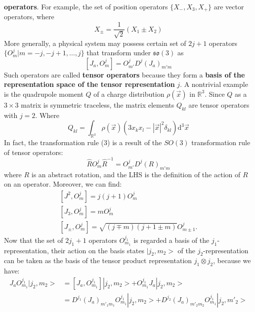 \documentclass{article}
\begin{document}
	\textbf{operators}. For example, the set of position operators $\{X_{-} ,X_{3} ,X_{+}\}$ are vector operators, where
	\begin{equation*}
		X_{\pm } =\frac{1}{\sqrt{2}}( X_{1} \pm X_{2})
	\end{equation*}
	More generally, a physical system may possess certain set of $2j+1$ operators $\{O_{m}^{j} | m=-j,-j+1,\dotsc ,j\}$ that transform under $\mathfrak{so} (3)$ as
	\begin{equation}
		\left[ J_{a} ,O_{m}^{j}\right] =O_{m'}^{j} D^{j}( J_{a})_{m' m}
	\end{equation}
	Such operators are called \textbf{tensor operators} because they form a \textbf{basis of the representation space of the tensor representation }$j$. A nontrivial example is the quadrupole moment $Q$ of a charge distribution $\rho (\vec{x} )$ in $\mathbb{R}^{3}$. Since $Q$ as a $3\times 3$ matrix is symmetric traceless, the matrix elements $Q_{kl}$ are tensor operators with $j=2$. Where
	\begin{equation*}
		Q_{kl} =\int _{\mathbb{R}^{3}} \rho (\vec{x})\left( 3x_{k} x_{l} -| \vec{x}| ^{2} \delta _{kl}\right)\mathrm{d}^{3}\vec{x}
	\end{equation*}
	In fact, the transformation rule (3) is a result of the $SO( 3)$ transformation rule of tensor operators:
	\begin{equation*}
		\hat{R} O_{m}^{j}\hat{R}^{-1} =O_{m'}^{j} D^{j} (R)_{m'm}
	\end{equation*}
	where $R$ is an abstract rotation, and the LHS is the definition of the action of $R$ on an operator. Moreover, we can find:
	\begin{equation}
		\begin{array}{ l }
			\left[ J^{2} ,O_{m}^{j}\right] =j(j+1)O_{m}^{j}\\
			\left[ J_{3} ,O_{m}^{j}\right] =mO_{m}^{j}\\
			\left[ J_{\pm } ,O_{m}^{j}\right] =\sqrt{(j\mp m)(j+1\pm m)} O_{m\pm 1}^{j} .
		\end{array}
	\end{equation}
	Now that the set of $2j_{1} +1$ operators $O_{m_{1}}^{j_{1}}$ is regarded a basis of the $j_{1}$-representation, their action on the basis states $| j_{2} ,m_{2}> $ of the $j_{2}$-representation can be taken as the basis of the tensor product representation $j_{1} \otimes j_{2}$, because we have:
	\begin{equation*}
		\begin{aligned}
			J_{a} O_{m_{1}}^{j_{1}}| j_{2} ,m_{2}>  & =\left[ J_{a} ,O_{m_{1}}^{j_{1}}\right]| j_{2} ,m_{2}> +O_{m_{1}}^{j_{1}} J_{a}| j_{2} ,m_{2}> \\
			& =D^{j_{1}}( J_{a})_{m'_{1} m_{1}} O_{m_{1}}^{j_{1}}| j_{2} ,m_{2}> +D^{j_{2}}( J_{a})_{m'_{2} m_{2}} O_{m_{1}}^{j_{1}}| j_{2} ,m'_{2}> 
		\end{aligned}
	\end{equation*}
\end{document}
